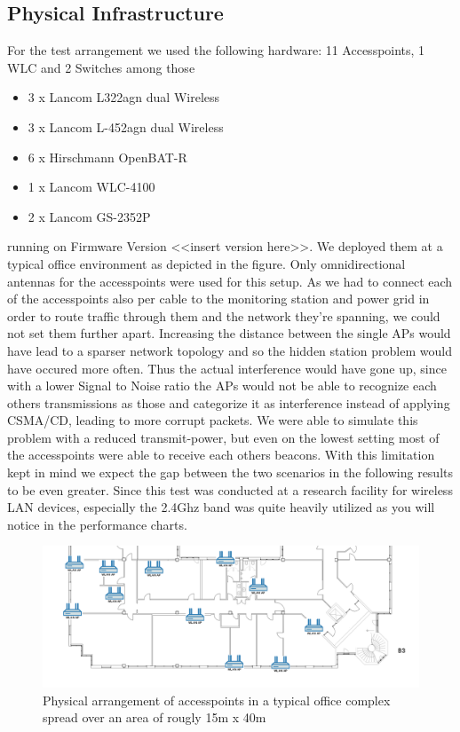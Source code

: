   \subsection{Physical Infrastructure}
    For the test arrangement we used the following hardware:
      11 Accesspoints, 1 WLC and 2 Switches among those
      \begin{itemize}
       \item 3 x Lancom L322agn dual Wireless
       \item 3 x Lancom L-452agn dual Wireless
       \item 6 x Hirschmann OpenBAT-R
       \item 1 x Lancom WLC-4100
       \item 2 x Lancom GS-2352P
      \end{itemize}
      running on Firmware Version <<insert version here>>. We deployed them at a typical office environment as depicted in the figure.
      Only omnidirectional antennas for the accesspoints were used for this setup. As we had to connect each of the accesspoints also
      per cable to the monitoring station and power grid in order to route traffic through them and the network they're spanning,
      we could not set them further apart.
      Increasing the distance between the single APs would have lead to a sparser network topology and so the hidden station problem would have occured
      more often. Thus the actual interference would have gone up, since with a lower Signal to Noise ratio the APs would not be able to recognize each others 
      transmissions as those and categorize it as interference instead of applying CSMA/CD, leading to more corrupt packets.
      We were able to simulate this problem with a reduced transmit-power,
      but even on the lowest setting most of the accesspoints were able to receive each others beacons. With this limitation kept in mind we expect
      the gap between the two scenarios in the following results to be even greater.
      Since this test was conducted at a research facility for wireless LAN devices, especially the 2.4Ghz band was quite heavily utilized as you will notice
      in the performance charts.
    \begin{figure}[t]
      \centering
      \includegraphics[width=1\columnwidth]{figures/Lancom-flur-withaps}
      \caption{Physical arrangement of accesspoints in a typical office complex spread over an area of rougly 15m x 40m}
      \label{fig:2ndfloor}
    \end{figure}
